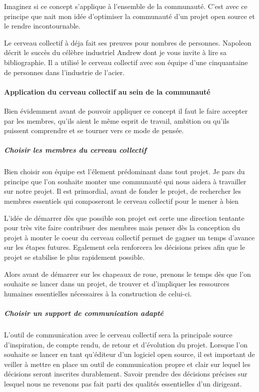 			Imaginez si ce concept s'applique à l'ensemble de la communauté. C'est avec ce principe que nait mon idée d'optimiser la communauté d'un projet open source et le rendre incontournable.

			Le cerveau collectif à déja fait ses preuves pour nombres de personnes. Napoleon  décrit le succès du célèbre industriel Andrew  dont je vous invite à lire sa bibliographie. Il a utilisé le cerveau collectif avec son équipe d'une cinquantaine de personnes dans l'industrie de l'acier.

			\paragraph{Application du cerveau collectif au sein de la communauté\\}

			Bien évidemment avant de pouvoir appliquer ce concept il faut le faire accepter par les membres, qu'ils aient le même esprit de travail, ambition ou qu'ils puissent comprendre et se tourner vers ce mode de pensée.

				\subparagraph{Choisir les membres du cerveau collectif\\}

					Bien choisir son équipe est l'élement prédominant dans tout projet. Je pars du principe que l'on souhaite monter une communauté qui nous aidera à travailler sur notre projet. Il est primordial, avant de fonder le projet, de rechercher les membres essentiels qui composeront le cerveau collectif pour le mener à bien

					L'idée de démarrer dès que possible son projet est certe une direction tentante pour très vite faire contribuer des membres mais penser dès la conception du projet à monter le coeur du cerveau collectif permet de gagner un temps d'avance sur les étapes futures. Egalement cela renforcera les décisions prises afin que le projet se stabilise le plus rapidement possible.

					Alors avant de démarrer sur les chapeaux de roue, prenons le temps dès que l'on souhaite se lancer dans un projet, de trouver et d'impliquer les ressources humaines essentielles nécessaires à la construction de celui-ci. 

				\subparagraph{Choisir un support de communication adapté\\}

					L'outil de communication avec le cerveau collectif sera la principale source d'inspiration, de compte rendu, de retour et d'évolution du projet.
					Lorsque l'on souhaite se lancer en tant qu'éditeur d'un logiciel open source, il est important de veiller à mettre en place un outil de communication propre et clair sur lequel les décisions seront inscrites durablement.
					Savoir prendre des décisions précises sur lesquel nous ne revenons pas fait parti des qualités essentielles d'un dirigeant.

